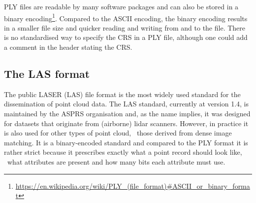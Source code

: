 PLY files are readable by many software packages and can also be stored in a binary encoding\footnote{\url{https://en.wikipedia.org/wiki/PLY_(file_format)\#ASCII_or_binary_format}}.
Compared to the ASCII encoding, the binary encoding results in a smaller file size and quicker reading and writing from and to the file.
There is no standardised way to specify the CRS in a PLY file, although one could add a comment in the header stating the CRS\@.

\subsection{The LAS format}
The public LASER (LAS) file format is the most widely used standard for the dissemination of point cloud data.
The LAS standard, currently at version 1.4, is maintained by the ASPRS organisation and, as the name implies, it was designed for datasets that originate from (airborne) lidar scanners.
However, in practice it is also used for other types of point cloud, \eg\ those derived from dense image matching.
It is a binary-encoded standard and compared to the PLY format it is rather strict because it prescribes exactly what a point record should look like, \ie\ what attributes are present and how many bits each attribute must use. 


